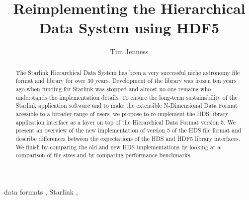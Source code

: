 \documentclass[final,authoryear,5p,times,twocolumn]{elsarticle}
\begin{document}
\begin{frontmatter}



\title{Reimplementing the Hierarchical Data System using HDF5}


\author[cornell]{Tim Jenness}


\address[cornell]{Department of Astronomy, Cornell University, Ithaca,
  NY 14853, USA}

\begin{abstract}
The Starlink Hierarchical Data System has been a very successful niche
astronomy file format and library for over 30 years. Development of the library
was frozen ten years ago when funding for Starlink was stopped and almost no-one
remains who understands the implementation details. To ensure the
long-term sustainability of the Starlink application software and to
make the extensible N-Dimensional Data Format acessible to a
broader range of users, we propose to re-implement the HDS library
application interface as a layer on top of the Hierarchical Data
Format version 5. We present an overview of the new implementation of
version 5 of the HDS file format and describe differences between the
expectations of the HDS and HDF5 library interfaces. We finish by
comparing the old and new HDS implementations by looking at a
comparison of file sizes and by comparing performance benchmarks.

\end{abstract}

\begin{keyword}


data formats \sep
Starlink \sep

\end{keyword}

\end{frontmatter}
\end{document}
